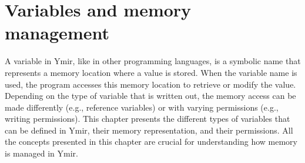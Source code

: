 \chapter{Variables and memory management}
\pagecolor{gray!10!white}
\label{chap:chap6}

A variable in Ymir, like in other programming languages, is a symbolic name that
represents a memory location where a value is stored. When the variable name is
used, the program accesses this memory location to retrieve or modify the value.
Depending on the type of variable that is written out, the memory access can be
made differently (e.g., reference variables) or with varying permissions (e.g.,
writing permissions). This chapter presents the different types of variables
that can be defined in Ymir, their memory representation, and their permissions.
All the concepts presented in this chapter are crucial for understanding how
memory is managed in Ymir.

\minitoc%








